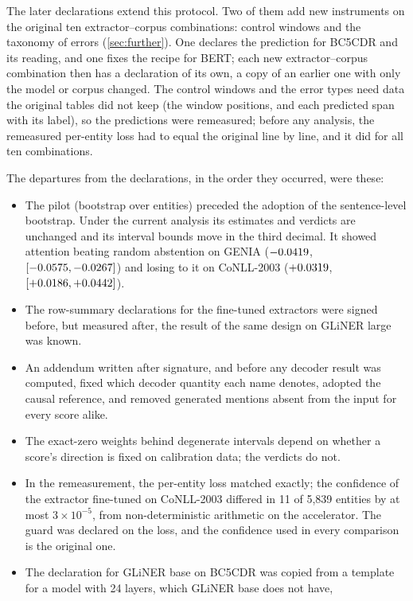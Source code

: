 \documentclass[11pt,a4paper]{article}
\newcommand{\gliner}{GLiNER}
\begin{document}
The later declarations extend this protocol. Two of them add new instruments on the original ten extractor--corpus
combinations: control windows and the taxonomy of errors (\cref{sec:further}). One declares the prediction for BC5CDR and its
reading, and one fixes the recipe for BERT; each new extractor--corpus combination then has a declaration of its own, a copy
of an earlier one with only the model or corpus changed. The control windows and the error types need data the original
tables did not keep (the window positions, and each predicted span with its label), so the predictions were remeasured; before
any analysis, the remeasured per-entity loss had to equal the original line by line, and it did for all ten combinations.

The departures from the declarations, in the order they occurred, were these:
\begin{itemize}
  \item The pilot (bootstrap over entities) preceded the adoption of the sentence-level bootstrap. Under the current analysis its estimates and
  verdicts are unchanged and its interval bounds move in the third decimal. It showed attention beating random abstention on GENIA
  ($-0.0419$, $[-0.0575, -0.0267]$) and losing to it on CoNLL-2003 ($+0.0319$,
  $[+0.0186, +0.0442]$).
  \item The row-summary declarations for the fine-tuned extractors were signed before, but measured after, the result of the same design on
  \gliner{} large was known.
  \item An addendum written after signature, and before any decoder result was computed, fixed which decoder quantity each name denotes, adopted
  the causal reference, and removed generated mentions absent from the input for every score alike.
  \item The exact-zero weights behind degenerate intervals depend on whether a score's direction is fixed on calibration data; the verdicts do not.
  \item In the remeasurement, the per-entity loss matched exactly; the confidence of the extractor fine-tuned on CoNLL-2003 differed in
  11 of 5{,}839 entities by at most $3\times10^{-5}$, from non-deterministic arithmetic on the accelerator. The guard was declared on the loss,
  and the confidence used in every comparison is the original one.
  \item The declaration for \gliner{} base on BC5CDR was copied from a template for a model with 24 layers, which \gliner{} base does not have,

\end{itemize}
\end{document}
